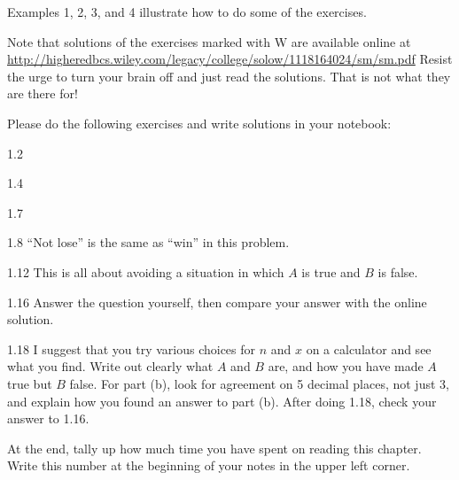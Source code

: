Examples 1, 2, 3, and 4 illustrate how to do some of the exercises.

Note that solutions of the exercises marked with W are available online at\\ \url{http://higheredbcs.wiley.com/legacy/college/solow/1118164024/sm/sm.pdf}
Resist the urge to turn your brain off and just read the solutions.  
That is not what they are there for!

Please do the following exercises and write solutions in your notebook:

1.2

1.4 

1.7

1.8 ``Not lose'' is the same as ``win'' in this problem.

1.12 This is all about avoiding a situation in which $A$ is true and $B$ is false.

1.16 Answer the question yourself, then compare your answer with the online solution.

1.18 I suggest that you try various choices for $n$ and $x$ on a calculator and see what you find.  
Write out clearly what $A$ and $B$ are, and how you have made $A$ true but $B$ false.
For part (b), look for agreement on 5 decimal places, not just 3, and explain how you found an answer to part (b).
After doing 1.18, check your answer to 1.16.


At the end, tally up how much time you have spent on reading this chapter.
Write this number at the beginning of your notes in the upper left corner.

